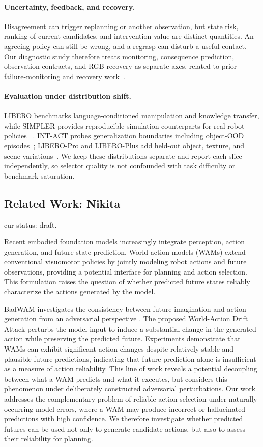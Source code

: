 \documentclass{article}
\begin{document}
\paragraph{Uncertainty, feedback, and recovery.}
Disagreement can trigger replanning or another observation, but state risk,
ranking of current candidates, and intervention value are distinct quantities.
An agreeing policy can still be wrong, and a regrasp can disturb a useful
contact. Our diagnostic study therefore treats monitoring,
consequence prediction, observation contracts, and RGB recovery as separate
axes, related to prior failure-monitoring and recovery work~\cite{sentinel,rewind,save}.

\paragraph{Evaluation under distribution shift.}
LIBERO benchmarks language-conditioned manipulation and knowledge transfer, while
SIMPLER provides reproducible simulation counterparts for real-robot policies
~\cite{libero,simpler}. INT-ACT probes generalization boundaries including
object-OOD episodes~\cite{intact}; LIBERO-Pro and LIBERO-Plus add held-out
object, texture, and scene variations~\cite{liberopro,liberoplus}. We keep these
distributions separate and report each slice independently, so selector quality
is not confounded with task difficulty or benchmark saturation.


\subsection{Related Work: Nikita}
cur status: draft.

Recent embodied foundation models increasingly integrate perception, action generation, and future-state prediction. World-action models (WAMs) extend conventional visuomotor policies by jointly modeling robot actions and future observations, providing a potential interface for planning and action selection. This formulation raises the question of whether predicted future states reliably characterize the actions generated by the model.

BadWAM investigates the consistency between future imagination and action generation from an adversarial perspective \cite{li2026badwam}. The proposed World-Action Drift Attack perturbs the model input to induce a substantial change in the generated action while preserving the predicted future. Experiments demonstrate that WAMs can exhibit significant action changes despite relatively stable and plausible future predictions, indicating that future prediction alone is insufficient as a measure of action reliability. This line of work reveals a potential decoupling between what a WAM predicts and what it executes, but considers this phenomenon under deliberately constructed adversarial perturbations. Our work addresses the complementary problem of reliable action selection under naturally occurring model errors, where a WAM may produce incorrect or hallucinated predictions with high confidence. We therefore investigate whether predicted futures can be used not only to generate candidate actions, but also to assess their reliability for planning.
\end{document}
